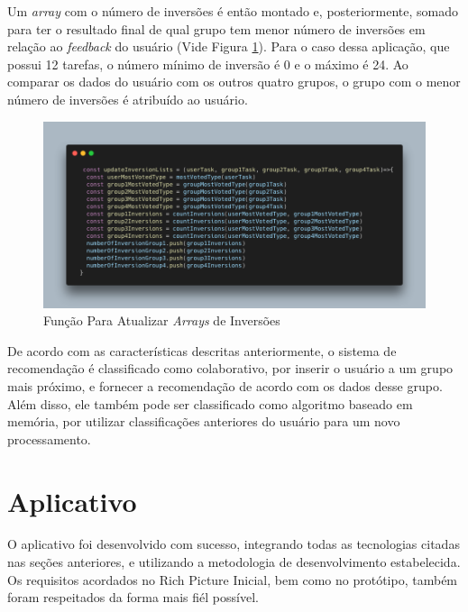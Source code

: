 \newpage

Um \emph{array} com o número de inversões é então montado e, posteriormente, somado para ter o resultado final de qual grupo tem menor número de 
inversões em relação ao \emph{feedback} do usuário (Vide Figura \ref{fig17}). 
Para o caso dessa aplicação, que possui 12 tarefas, o número mínimo de inversão é 0 e o máximo é 24. Ao comparar os dados do usuário 
com os outros quatro grupos, o grupo com o menor número de inversões é atribuído ao usuário. 

\begin{figure}[htbp]
	\caption{Função Para Atualizar \emph{Arrays} de Inversões}
	\begin{center}
	\includegraphics[keepaspectratio=true,scale=0.4]{figuras/code-updateInversionLists.png}
	\end{center}
    \label{fig17}
\end{figure}

De acordo com as características descritas anteriormente, o sistema de recomendação é classificado como colaborativo, por inserir o usuário a 
um grupo mais próximo, e fornecer a recomendação de acordo com os dados desse grupo. Além disso, ele também pode ser classificado como 
algoritmo baseado em memória, por utilizar classificações anteriores do usuário para um novo processamento.


\section{Aplicativo}

O aplicativo foi desenvolvido com sucesso, integrando todas as tecnologias citadas nas seções anteriores, e 
utilizando a metodologia de desenvolvimento estabelecida. Os requisitos acordados no Rich Picture Inicial, bem como no protótipo, também foram respeitados da forma
mais fiél possível.

